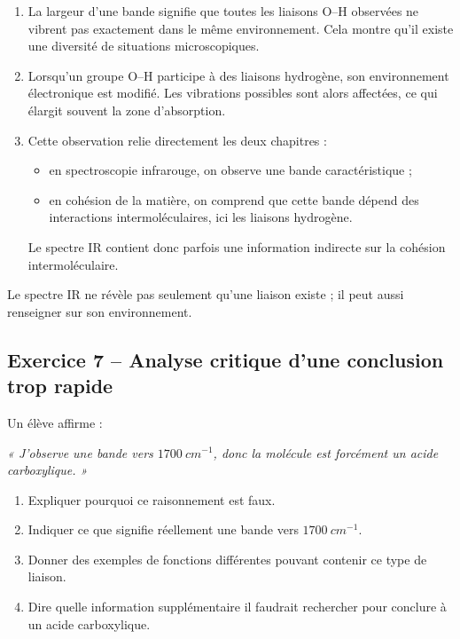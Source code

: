 \documentclass[11pt,a4paper]{article}
\newcommand{\chapitreA}{cohésion de la matière}
\newcommand{\chapitreB}{spectroscopie infrarouge}
\begin{document}
\begin{corrigebox}
\begin{enumerate}[label=\arabic*)]
    \item La largeur d'une bande signifie que toutes les liaisons O--H observées ne vibrent pas exactement dans le même environnement.  
    Cela montre qu'il existe une diversité de situations microscopiques.
    
    \item Lorsqu'un groupe O--H participe à des liaisons hydrogène, son environnement électronique est modifié.  
    Les vibrations possibles sont alors affectées, ce qui élargit souvent la zone d'absorption.
    
    \item Cette observation relie directement les deux chapitres :
    \begin{itemize}
        \item en \chapitreB{}, on observe une bande caractéristique ;
        \item en \chapitreA{}, on comprend que cette bande dépend des interactions intermoléculaires, ici les liaisons hydrogène.
    \end{itemize}
    Le spectre IR contient donc parfois une information indirecte sur la cohésion intermoléculaire.
\end{enumerate}

\begin{ideebox}
Le spectre IR ne révèle pas seulement qu'une liaison existe ; il peut aussi renseigner sur son environnement.
\end{ideebox}
\end{corrigebox}

\subsection{Exercice 7 -- Analyse critique d'une conclusion trop rapide}

\begin{enoncebox}
Un élève affirme :

\begin{center}
\textit{« J'observe une bande vers \(1700\ \si{cm^{-1}}\), donc la molécule est forcément un acide carboxylique. »}
\end{center}

\begin{enumerate}[label=\arabic*)]
    \item Expliquer pourquoi ce raisonnement est faux.
    \item Indiquer ce que signifie réellement une bande vers \(1700\ \si{cm^{-1}}\).
    \item Donner des exemples de fonctions différentes pouvant contenir ce type de liaison.
    \item Dire quelle information supplémentaire il faudrait rechercher pour conclure à un acide carboxylique.
\end{enumerate}
\end{enoncebox}
\end{document}
